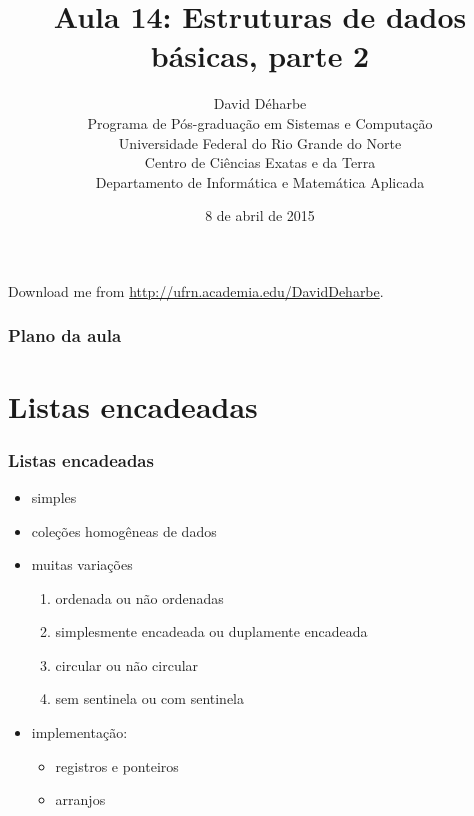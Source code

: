 \documentclass{beamer}
\title{Aula 14: Estruturas de dados básicas, parte 2}
\author{David Déharbe \\
  Programa de Pós-graduação em Sistemas e Computação \\
  Universidade Federal do Rio Grande do Norte \\
  Centro de Ciências Exatas e da Terra \\
  Departamento de Informática e Matemática Aplicada}
\date{8 de abril de 2015}
\begin{document}
\begin{frame}
  \titlepage
  Download me from \url{http://ufrn.academia.edu/DavidDeharbe}.
\end{frame}

\begin{frame}
  \frametitle{Plano da aula}
  \tableofcontents
\end{frame}

\section{Listas encadeadas}

\begin{frame}
  \frametitle{Listas encadeadas}

  \begin{itemize}
  \item simples
  \item coleções homogêneas de dados
  \item muitas variações
    \begin{enumerate}
      \item ordenada ou não ordenadas
      \item simplesmente encadeada ou duplamente encadeada
      \item circular ou não circular
      \item sem sentinela ou com sentinela
    \end{enumerate}
  \item implementação:
    \begin{itemize}
      \item registros e ponteiros
      \item arranjos
    \end{itemize}
  \end{itemize}

\end{frame}
\end{document}
